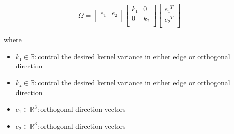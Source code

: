 \documentclass[12pt]{article}
\begin{document}
\[
\textit{Ω} = \begin{bmatrix}
\textit{e₁} & \textit{e₂}\\
\end{bmatrix}\begin{bmatrix}
\textit{k₁} & 0\\
0 & \textit{k₂}\\
\end{bmatrix}\begin{bmatrix}
\textit{e₁}^T\\
\textit{e₂}^T\\
\end{bmatrix}
\]

where
\begin{itemize}
\item $\textit{k₁} \in \mathbb{{R}}:$control the desired kernel variance in either edge or orthogonal direction
\item $\textit{k₂} \in \mathbb{{R}}:$control the desired kernel variance in either edge or orthogonal direction
\item $\textit{e₁} \in \mathbb{R}^{ 3}:$orthogonal direction vectors
\item $\textit{e₂} \in \mathbb{R}^{ 3}:$orthogonal direction vectors
\end{itemize}
\end{document}
